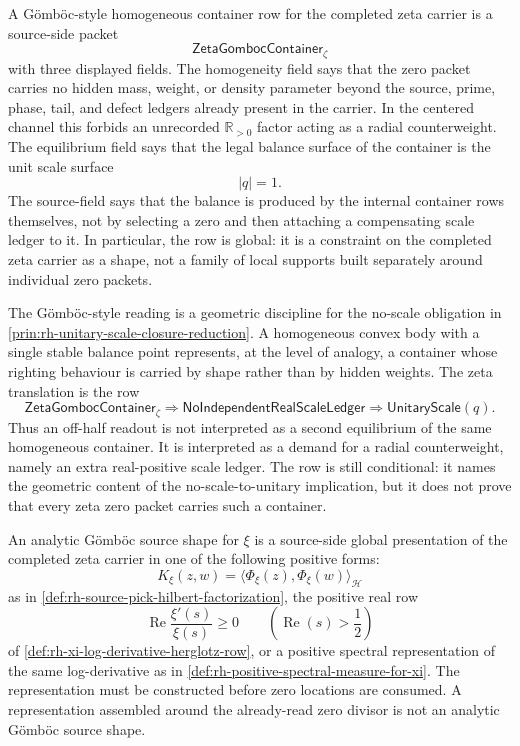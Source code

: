 \begin{definition}
\label{def:rh-gomboc-homogeneous-container-row}
A G\"omb\"oc-style homogeneous container row for the completed zeta
carrier is a source-side packet
$$
\mathsf{ZetaGombocContainer}_{\zeta}
$$
with three displayed fields.  The homogeneity field says that the zero
packet carries no hidden mass, weight, or density parameter beyond the
source, prime, phase, tail, and defect ledgers already present in the
carrier.  In the centered channel this forbids an unrecorded
$\mathbb R_{>0}$ factor acting as a radial counterweight.  The equilibrium
field says that the legal balance surface of the container is the unit
scale surface
$$
|q|=1.
$$
The source-field says that the balance is produced by the internal
container rows themselves, not by selecting a zero and then attaching a
compensating scale ledger to it.  In particular, the row is global: it is
a constraint on the completed zeta carrier as a shape, not a family of
local supports built separately around individual zero packets.
\end{definition}

\begin{principle}
\label{prin:rh-analytic-gomboc-reading}
The G\"omb\"oc-style reading is a geometric discipline for the no-scale
obligation in \autoref{prin:rh-unitary-scale-closure-reduction}.  A
homogeneous convex body with a single stable balance point represents, at
the level of analogy, a container whose righting behaviour is carried by
shape rather than by hidden weights.  The zeta translation is the row
$$
\mathsf{ZetaGombocContainer}_{\zeta}
\Longrightarrow
\mathsf{NoIndependentRealScaleLedger}
\Longrightarrow
\mathsf{UnitaryScale}(q).
$$
Thus an off-half readout is not interpreted as a second equilibrium of
the same homogeneous container.  It is interpreted as a demand for a
radial counterweight, namely an extra real-positive scale ledger.  The
row is still conditional: it names the geometric content of the
no-scale-to-unitary implication, but it does not prove that every zeta
zero packet carries such a container.
\end{principle}

\begin{definition}
\label{def:rh-analytic-gomboc-source-shape}
An analytic G\"omb\"oc source shape for $\xi$ is a source-side global
presentation of the completed zeta carrier in one of the following
positive forms:
$$
K_{\xi}(z,w)=\langle\Phi_{\xi}(z),\Phi_{\xi}(w)\rangle_{\mathcal H}
$$
as in \autoref{def:rh-source-pick-hilbert-factorization}, the positive
real row
$$
\operatorname{Re}\frac{\xi'(s)}{\xi(s)}\ge0
\qquad
\left(\operatorname{Re}(s)>\frac12\right)
$$
of \autoref{def:rh-xi-log-derivative-herglotz-row}, or a positive
spectral representation of the same log-derivative as in
\autoref{def:rh-positive-spectral-measure-for-xi}.  The representation
must be constructed before zero locations are consumed.  A representation
assembled around the already-read zero divisor is not an analytic
G\"omb\"oc source shape.
\end{definition}

